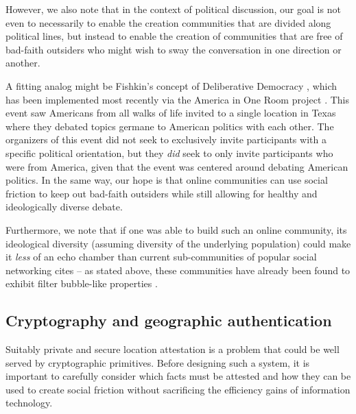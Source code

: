 \documentclass[sigconf,authordraft]{acmart}
\begin{document}
However, we also note that in the context of political discussion, our goal is not even to necessarily to enable the creation communities that are divided along political lines, but instead to enable the creation of communities that are free of bad-faith outsiders who might wish to sway the conversation in one direction or another. 

A fitting analog might be Fishkin's concept of Deliberative Democracy \cite{fishkin1991democracy}, which has been implemented most recently via the America in One Room project \cite{AmericaInOneRoom}. This event saw Americans from all walks of life invited to a single location in Texas where they debated topics germane to American politics with each other. The organizers of this event did not seek to exclusively invite participants with a specific political orientation, but they {\itshape did} seek to only invite participants who were from America, given that the event was centered around debating American politics. In the same way, our hope is that online communities can use social friction to keep out bad-faith outsiders while still allowing for healthy and ideologically diverse debate.

Furthermore, we note that if one was able to build such an online community, its ideological diversity (assuming diversity of the underlying population) could make it {\itshape less} of an echo chamber than current sub-communities of popular social networking cites -- as stated above, these communities have already been found to exhibit filter bubble-like properties \cite{garimella2018political}.

\subsection{Cryptography and geographic authentication}
\label{sec:crypto}

Suitably private and secure location attestation is a problem that could be well served by cryptographic primitives. Before designing such a system, it is important to carefully consider which facts must be attested and how they can be used to create social friction without sacrificing the efficiency gains of information technology.
\end{document}
